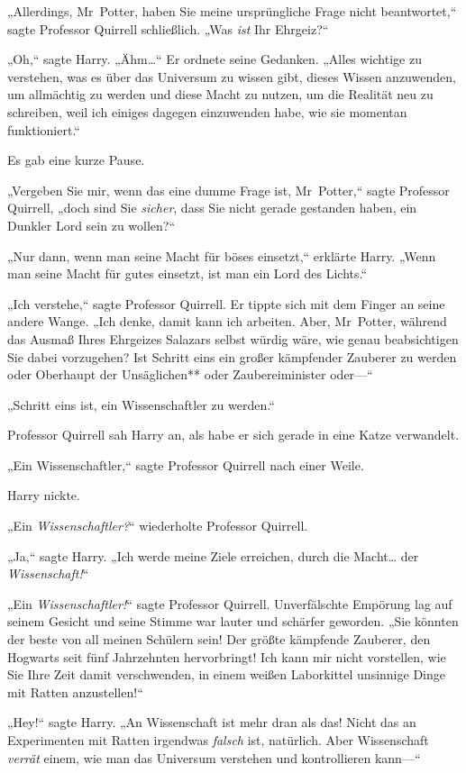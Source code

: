 {„Allerdings, Mr~Potter, haben Sie meine ursprüngliche Frage nicht beantwortet,“ sagte Professor Quirrell schließlich. „Was \emph{ist} Ihr Ehrgeiz?“

„Oh,“ sagte Harry. „Ähm…“ Er ordnete seine Gedanken. „Alles wichtige zu verstehen, was es über das Universum zu wissen gibt, dieses Wissen anzuwenden, um allmächtig zu werden und diese Macht zu nutzen, um die Realität neu zu schreiben, weil ich einiges dagegen einzuwenden habe, wie sie momentan funktioniert.“

Es gab eine kurze Pause.

„Vergeben Sie mir, wenn das eine dumme Frage ist, Mr~Potter,“ sagte Professor Quirrell, „doch sind Sie \emph{sicher}, dass Sie nicht gerade gestanden haben, ein Dunkler Lord sein zu wollen?“

„Nur dann, wenn man seine Macht für böses einsetzt,“ erklärte Harry. „Wenn man seine Macht für gutes einsetzt, ist man ein Lord des Lichts.“

„Ich verstehe,“ sagte Professor Quirrell. Er tippte sich mit dem Finger an seine andere Wange. „Ich denke, damit kann ich arbeiten. Aber, Mr~Potter, während das Ausmaß Ihres Ehrgeizes Salazars selbst würdig wäre, wie genau beabsichtigen Sie dabei vorzugehen? Ist Schritt eins ein großer kämpfender Zauberer zu werden oder Oberhaupt der Unsäglichen** oder Zaubereiminister oder—“

„Schritt eins ist, ein Wissenschaftler zu werden.“

Professor Quirrell sah Harry an, als habe er sich gerade in eine Katze verwandelt.

„Ein Wissenschaftler,“ sagte Professor Quirrell nach einer Weile.

Harry nickte.

„Ein \emph{Wissenschaftler?}“ wiederholte Professor Quirrell.

„Ja,“ sagte Harry. „Ich werde meine Ziele erreichen, durch die Macht… der \emph{Wissenschaft!}“

„Ein \emph{Wissenschaftler!}“ sagte Professor Quirrell. Unverfälschte Empörung lag auf seinem Gesicht und seine Stimme war lauter und schärfer geworden. „Sie könnten der beste von all meinen Schülern sein! Der größte kämpfende Zauberer, den Hogwarts seit fünf Jahrzehnten hervorbringt! Ich kann mir nicht vorstellen, wie Sie Ihre Zeit damit verschwenden, in einem weißen Laborkittel unsinnige Dinge mit Ratten anzustellen!“

„Hey!“ sagte Harry. „An Wissenschaft ist mehr dran als das! Nicht das an Experimenten mit Ratten irgendwas \emph{falsch} ist, natürlich. Aber Wissenschaft \emph{verrät} einem, wie man das Universum verstehen und kontrollieren kann—“

}
